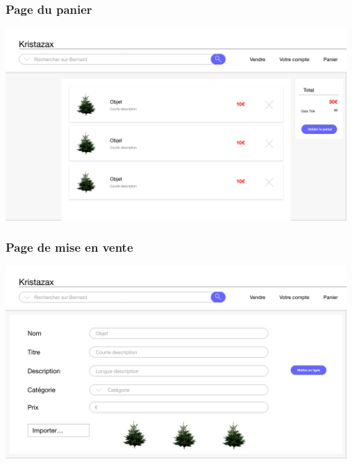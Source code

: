 \subsubsection{Page du panier}
\includegraphics[width=13cm]{Images/maquette/Panier}
\\
\subsubsection{Page de mise en vente}
\includegraphics[width=13cm]{Images/maquette/Vendre}